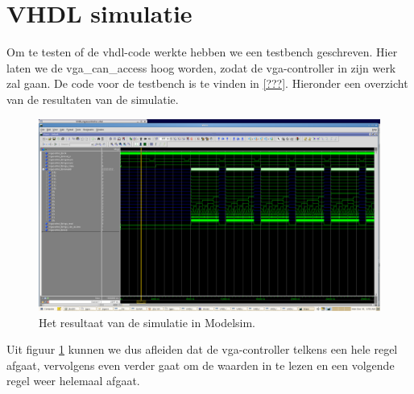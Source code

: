 \documentclass{scrartcl}  %
\begin{document}
\section{VHDL simulatie}
Om te testen of de vhdl-code werkte hebben we een testbench geschreven. Hier laten we de vga\_can\_access hoog worden, zodat de vga-controller in zijn werk zal gaan. De code voor de testbench is te vinden in \ref{???}. Hieronder een overzicht van de resultaten van de simulatie.
\begin{figure}[H]
\centering
		\includegraphics[width=1\textwidth]{resource/simmodvgafinal.png}
		
		\caption{Het resultaat van de simulatie in Modelsim.}
		\label{fig:sim}
\end{figure}
Uit figuur \ref{fig:sim} kunnen we dus afleiden dat de vga-controller telkens een hele regel afgaat, vervolgens even verder gaat om de waarden in te lezen en een volgende regel weer helemaal afgaat. 
\end{document}
